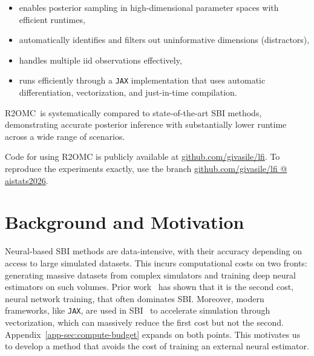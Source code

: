 \documentclass[twoside]{article}
\newcommand{\rromc}{R2OMC}
\begin{document}
\begin{itemize}
 \item enables posterior sampling in high-dimensional parameter spaces with efficient runtimes,
 \item automatically identifies and filters out uninformative dimensions (distractors),
 \item handles multiple iid observations effectively,
 \item runs efficiently through a \texttt{JAX} implementation that uses automatic differentiation, vectorization, and just-in-time compilation.
 \end{itemize}

 \rromc~is systematically compared to state-of-the-art SBI methods, demonstrating accurate posterior inference with substantially lower runtime across a wide range of scenarios.

 Code for using R2OMC is publicly available at \href{https://github.com/givasile/lfi}{github.com/givasile/lfi}.
 To reproduce the experiments exactly, use the branch \href{https://github.com/givasile/lfi/tree/aistats2026}{github.com/givasile/lfi @ aistats2026}.

\section{Background and Motivation}

Neural-based SBI methods are data-intensive, with their accuracy depending on access to large simulated datasets.
This incurs computational costs on two fronts:
generating massive datasets from complex simulators and
training deep neural estimators on such volumes.
Prior work~\citep{lueckmann2021benchmarking} has shown that it is the second cost, neural network training, that often dominates SBI.
Moreover, modern frameworks, like \texttt{JAX}, are used in SBI~\citep{dirmeier2024simulation, quera2023blackbirds} to accelerate simulation through vectorization, which can massively reduce the first cost but not the second.
Appendix~\ref{app-sec:compute-budget} expands on both points. 
This motivates us to develop a method that avoids the cost of training an external neural estimator.
 
\end{document}
